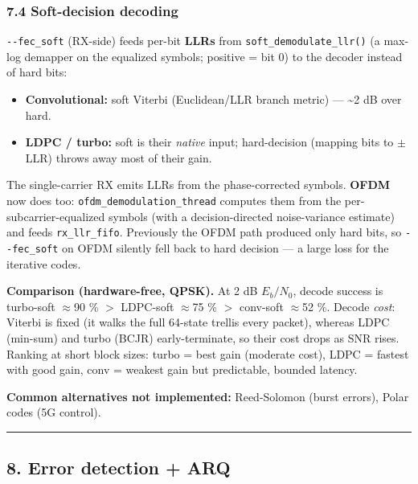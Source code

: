 \documentclass[
  10pt,
]{article}
\providecommand{\tightlist}{%
  \setlength{\itemsep}{0pt}\setlength{\parskip}{0pt}}
\begin{document}
\hypertarget{74-soft-decision-decoding}{%
\subsubsection{7.4 Soft-decision
decoding}\label{74-soft-decision-decoding}}

\texttt{-\/-fec\_soft} (RX-side) feeds per-bit \textbf{LLRs} from
\texttt{soft\_demodulate\_llr()} (a max-log demapper on the equalized
symbols; positive = bit 0) to the decoder instead of hard bits:

\begin{itemize}
\tightlist
\item
  \textbf{Convolutional:} soft Viterbi (Euclidean/LLR branch metric) ---
  \textasciitilde2 dB over hard.
\item
  \textbf{LDPC / turbo:} soft is their \emph{native} input;
  hard-decision (mapping bits to \(\pm\)LLR) throws away most of their
  gain.
\end{itemize}

The single-carrier RX emits LLRs from the phase-corrected symbols.
\textbf{OFDM} now does too: \texttt{ofdm\_demodulation\_thread} computes
them from the per-subcarrier-equalized symbols (with a decision-directed
noise-variance estimate) and feeds \texttt{rx\_llr\_fifo}. Previously
the OFDM path produced only hard bits, so \texttt{-\/-fec\_soft} on OFDM
silently fell back to hard decision --- a large loss for the iterative
codes.

\textbf{Comparison (hardware-free, QPSK).} At 2 dB \(E_b/N_0\), decode
success is turbo-soft \(\approx\)90 \% \(>\) LDPC-soft \(\approx\)75 \%
\(>\) conv-soft \(\approx\)52 \%. Decode \emph{cost}: Viterbi is fixed
(it walks the full 64-state trellis every packet), whereas LDPC
(min-sum) and turbo (BCJR) early-terminate, so their cost drops as SNR
rises. Ranking at short block sizes: turbo = best gain (moderate cost),
LDPC = fastest with good gain, conv = weakest gain but predictable,
bounded latency.

\textbf{Common alternatives not implemented:} Reed-Solomon (burst
errors), Polar codes (5G control).

\begin{center}\rule{0.5\linewidth}{0.5pt}\end{center}

\hypertarget{8-error-detection--arq}{%
\subsection{8. Error detection + ARQ}\label{8-error-detection--arq}}
\end{document}
